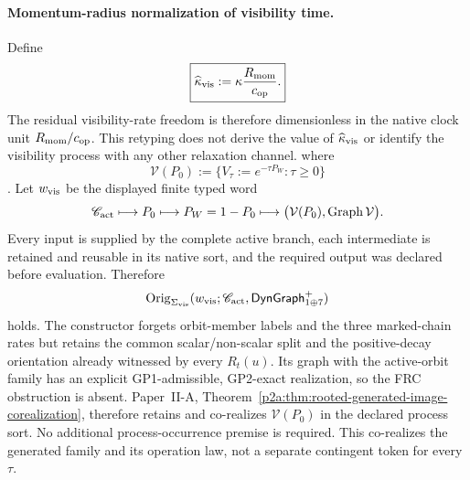 \documentclass[12pt,a4paper]{article}
\begin{document}
\begin{theorem}
\paragraph{Momentum-radius normalization of visibility time.}
Define
\[
 \boxed{\widehat\kappa_{\rm vis}:=\kappa\frac{R_{\rm mom}}{c_{\rm op}}.}
\]
The residual visibility-rate freedom is therefore dimensionless in the native
clock unit \(R_{\rm mom}/c_{\rm op}\).  This retyping does not derive the value
of \(\widehat\kappa_{\rm vis}\) or identify the visibility process with any
other relaxation channel.
where
\begin{equation}
\label{p3c:eq:generated-resolution-role}
 \mathcal V(P_0)
 :=\{V_\tau:=e^{-\tau P_W}:\tau\ge0\}
\end{equation}.
Let \(w_{\rm vis}\) be the displayed finite typed word
\[
 \mathscr C_{\rm act}\longmapsto P_0
 \longmapsto P_W=1-P_0
 \longmapsto
 \bigl(\mathcal V(P_0),\operatorname{Graph}\mathcal V\bigr).
\]
Every input is supplied by the complete active branch, each intermediate is
retained and reusable in its native sort, and the required output was declared
before evaluation.  Therefore
\[
 \operatorname{Orig}_{\Sigma_{\rm vis}}
 (w_{\rm vis};\mathscr C_{\rm act},
  \mathsf{DynGraph}_{1\oplus7}^{+})
\]
holds.
The constructor forgets orbit-member labels and the three marked-chain rates
but retains the common scalar/non-scalar split and the positive-decay
orientation already witnessed by every \(R_t(u)\).  Its graph with the
active-orbit family has an explicit GP1-admissible, GP2-exact realization, so
the FRC obstruction is absent.  Paper~II-A,
Theorem~\ref{p2a:thm:rooted-generated-image-corealization}, therefore retains
and co-realizes \(\mathcal V(P_0)\) in the declared process sort.  No
additional process-occurrence premise is required.  This co-realizes the
generated family and its operation law, not a separate contingent token for
every \(\tau\).


\end{theorem}
\end{document}
